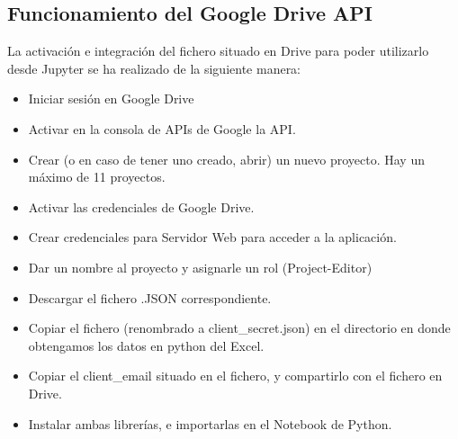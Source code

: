\subsection{Funcionamiento del Google Drive API }
La activación e integración del fichero situado en Drive para poder utilizarlo desde Jupyter se ha realizado de la siguiente manera: 
\begin{itemize}
\item Iniciar sesión en Google Drive
\item Activar en la consola de APIs de Google la API. 
\item Crear (o en caso de tener uno creado, abrir) un nuevo proyecto. Hay un máximo de 11 proyectos. 
\item Activar las credenciales de Google Drive. 
\item Crear credenciales para Servidor Web para acceder a la aplicación. 
\item Dar un nombre al proyecto y asignarle un rol (Project-Editor)
\item Descargar el fichero .JSON correspondiente. 
\item Copiar el fichero (renombrado a client\_secret.json) en el directorio en donde obtengamos los datos en python del Excel. 
\item Copiar el client\_email situado en el fichero, y compartirlo con el fichero en Drive.
\item Instalar ambas librerías, e importarlas en el Notebook  de Python. 
\end{itemize}



